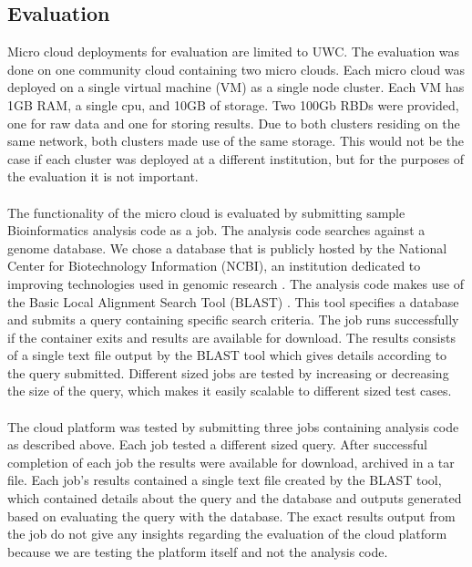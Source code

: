 \documentclass{sig-alternate-05-2015}
\begin{document}
\subsection{Evaluation}
Micro cloud deployments for evaluation are limited to UWC. The evaluation was done on one community cloud containing two micro clouds. Each micro cloud was deployed on a single virtual machine (VM) as a single node cluster. Each VM has 1GB RAM, a single cpu, and 10GB of storage. Two 100Gb RBDs were provided, one for raw data and one for storing results. Due to both clusters residing on the same network, both clusters made use of the same storage. This would not be the case if each cluster was deployed at a different institution, but for the purposes of the evaluation it is not important.
\\\\
The functionality of the micro cloud is evaluated by submitting sample Bioinformatics analysis code as a job. The analysis code searches against a genome database. We chose a database that is publicly hosted by the National Center for Biotechnology Information (NCBI), an institution dedicated to improving technologies used in genomic research \cite{pruitt2005ncbi}. The analysis code makes use of the Basic Local Alignment Search Tool (BLAST) \cite{camacho2009blast}. This tool specifies a database and submits a query containing specific search criteria. The job runs successfully if the container exits and results are available for download. The results consists of a single text file output by the BLAST tool which gives details according to the query submitted. Different sized jobs are tested by increasing or decreasing the size of the query, which makes it easily scalable to different sized test cases.
\\\\
The cloud platform was tested by submitting three jobs containing analysis code as described above. Each job tested a different sized query. After successful completion of each job the results were available for download, archived in a tar file. Each job's results contained a single text file created by the BLAST tool, which contained details about the query and the database and outputs generated based on evaluating the query with the database. The exact results output from the job do not give any insights regarding the evaluation of the cloud platform because we are testing the platform itself and not the analysis code. 
\end{document}

